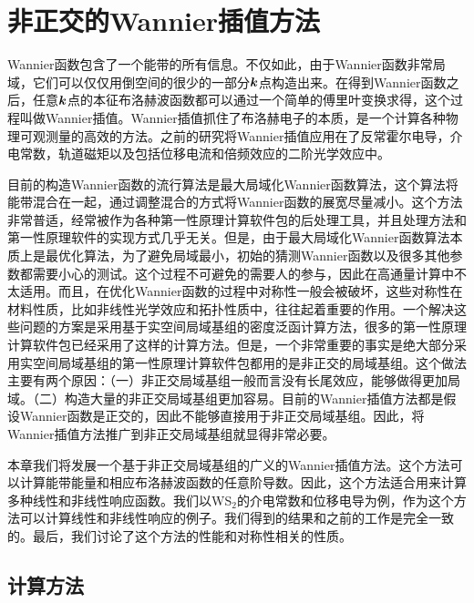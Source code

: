 \chapter{非正交的Wannier插值方法}

Wannier函数包含了一个能带的所有信息。不仅如此，由于Wannier函数非常局域，它们可以仅仅用倒空间的很少的一部分$\boldsymbol{k}$点构造出来\cite{souza_maximally-localized_2001,marzari_maximally_1997}。在得到Wannier函数之后，任意$\boldsymbol{k}$点的本征布洛赫波函数都可以通过一个简单的傅里叶变换求得，这个过程叫做Wannier插值\cite{marzari_maximally_2012}。Wannier插值抓住了布洛赫电子的本质，是一个计算各种物理可观测量的高效的方法。之前的研究将Wannier插值应用在了反常霍尔电导\cite{wang_textitab_2006}，介电常数\cite{yates_spectral_2007}，轨道磁矩\cite{lopez_wannier-based_2012}以及包括位移电流\cite{wang_first-principles_2017,ibanez-azpiroz_ab_2018}和倍频效应\cite{wang_first-principles_2017}的二阶光学效应中。


目前的构造Wannier函数的流行算法是最大局域化Wannier函数算法，这个算法将能带混合在一起，通过调整混合的方式将Wannier函数的展宽尽量减小\cite{marzari_maximally_2012}。这个方法非常普适，经常被作为各种第一性原理计算软件包的后处理工具\cite{mostofi_updated_2014}，并且处理方法和第一性原理软件的实现方式几乎无关。但是，由于最大局域化Wannier函数算法本质上是最优化算法，为了避免局域最小，初始的猜测Wannier函数以及很多其他参数都需要小心的测试。这个过程不可避免的需要人的参与，因此在高通量计算中不太适用。而且，在优化Wannier函数的过程中对称性一般会被破坏，这些对称性在材料性质，比如非线性光学效应和拓扑性质中，往往起着重要的作用。一个解决这些问题的方案是采用基于实空间局域基组的密度泛函计算方法，很多的第一性原理计算软件包已经采用了这样的计算方法。但是，一个非常重要的事实是绝大部分采用实空间局域基组的第一性原理计算软件包都用的是非正交的局域基组。这个做法主要有两个原因：（一）非正交局域基组一般而言没有长尾效应，能够做得更加局域。（二）构造大量的非正交局域基组更加容易。目前的Wannier插值方法都是假设Wannier函数是正交的，因此不能够直接用于非正交局域基组。因此，将Wannier插值方法推广到非正交局域基组就显得非常必要。

本章我们将发展一个基于非正交局域基组的广义的Wannier插值方法。这个方法可以计算能带能量和相应布洛赫波函数的任意阶导数。因此，这个方法适合用来计算多种线性和非线性响应函数。我们以WS$_2$的介电常数和位移电导为例，作为这个方法可以计算线性和非线性响应的例子。我们得到的结果和之前的工作是完全一致的。最后，我们讨论了这个方法的性能和对称性相关的性质。

\section{计算方法}\label{sec:method}

